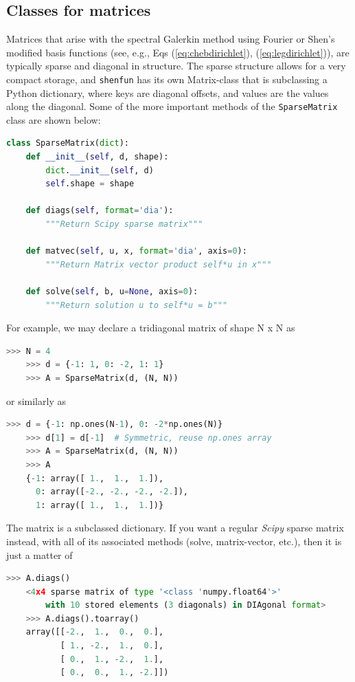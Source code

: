 \documentclass[%
oneside,                 %
final,                   %
10pt]{article}
\theoremstyle{definition}
\begin{document}
\subsection{Classes for matrices}
\label{sec:matrices}
Matrices that arise with the spectral Galerkin method using Fourier or Shen's modified basis functions (see, e.g., Eqs (\ref{eq:chebdirichlet}), (\ref{eq:legdirichlet})), are typically sparse and diagonal in structure. The sparse structure allows for a very compact storage, and \texttt{shenfun} has its own Matrix-class that is subclassing a Python dictionary, where keys are diagonal offsets, and values are the values along the diagonal. Some of the more important methods of the \texttt{SparseMatrix} class are shown below:

\begin{lstlisting}[language=Python,style=yellow2_fb]
class SparseMatrix(dict):
    def __init__(self, d, shape):
        dict.__init__(self, d)
        self.shape = shape
        
    def diags(self, format='dia'):
        """Return Scipy sparse matrix"""

    def matvec(self, u, x, format='dia', axis=0):
        """Return Matrix vector product self*u in x"""
        
    def solve(self, b, u=None, axis=0):
        """Return solution u to self*u = b"""
\end{lstlisting}

For example, we may declare a tridiagonal matrix of shape N x N as
\begin{lstlisting}[language=Python,style=yellow2_fb]
    >>> N = 4
    >>> d = {-1: 1, 0: -2, 1: 1}
    >>> A = SparseMatrix(d, (N, N))
\end{lstlisting}
or similarly as
\begin{lstlisting}[language=Python,style=yellow2_fb]
    >>> d = {-1: np.ones(N-1), 0: -2*np.ones(N)}
    >>> d[1] = d[-1]  # Symmetric, reuse np.ones array
    >>> A = SparseMatrix(d, (N, N))
    >>> A
    {-1: array([ 1.,  1.,  1.]),
      0: array([-2., -2., -2., -2.]),
      1: array([ 1.,  1.,  1.])}
\end{lstlisting}
The matrix is a subclassed dictionary. If you want a regular \emph{Scipy} sparse matrix instead, with all of its associated methods (solve, matrix-vector, etc.), then it is just a matter of
\begin{lstlisting}[language=Python,style=yellow2_fb]
    >>> A.diags()
    <4x4 sparse matrix of type '<class 'numpy.float64'>'
        with 10 stored elements (3 diagonals) in DIAgonal format>
    >>> A.diags().toarray()
    array([[-2.,  1.,  0.,  0.],
           [ 1., -2.,  1.,  0.],
           [ 0.,  1., -2.,  1.],
           [ 0.,  0.,  1., -2.]])
\end{lstlisting}
\end{document}
